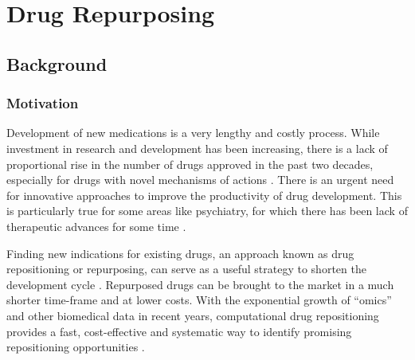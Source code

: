 \chapter{Drug Repurposing}
\label{chap:Repurposing}

\section{Background}
  \subsection{Motivation}
    Development of new medications is a very lengthy and costly process. While investment in research and development has been increasing, there is a lack of proportional rise in the number of drugs approved in the past two decades, especially for drugs with novel mechanisms of actions \cite{pammolli2011productivity}. There is an urgent need for innovative approaches to improve the productivity of drug development. This is particularly true for some areas like psychiatry, for which there has been lack of therapeutic advances for some time \cite{krystal2014psychiatric,hyman2013psychiatric}.
    
    Finding new indications for existing drugs, an approach known as drug repositioning or repurposing, can serve as a useful strategy to shorten the development cycle \cite{dudley2011exploiting}. Repurposed drugs can be brought to the market in a much shorter time-frame and at lower costs. With the exponential growth of “omics” and other biomedical data in recent years, computational drug repositioning provides a fast, cost-effective and systematic way to identify promising repositioning opportunities \cite{dudley2011exploiting}.  

